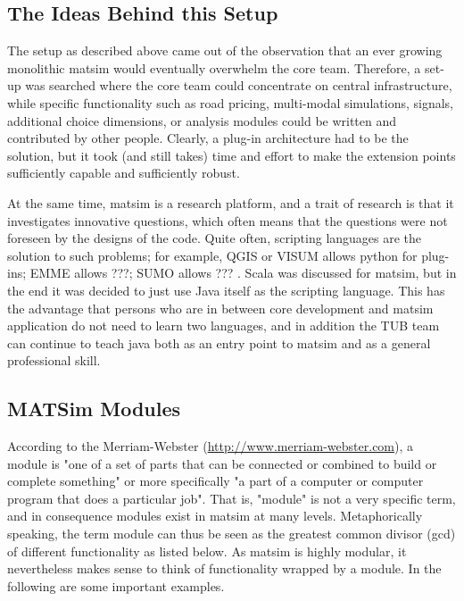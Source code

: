 
\subsection{The Ideas Behind this Setup}
The setup as described above came out of the observation that an ever growing monolithic \gls{matsim} would eventually overwhelm the core team. Therefore, a set-up was searched where the core team could concentrate on central infrastructure, while specific functionality such as road pricing, multi-modal simulations, signals, additional choice dimensions, or analysis modules could be written and contributed by other people. Clearly, a plug-in architecture had to be the solution, but it took (and still takes) time and effort to make the extension points sufficiently capable and sufficiently robust.  

At the same time, \gls{matsim} is a research platform, and a trait of research is that it investigates innovative questions, which often means that the questions were not foreseen by the designs of the code.  Quite often, scripting languages are the solution to such problems; for example, QGIS or VISUM allows python \cite{...} for plug-ins; EMME allows ???; SUMO allows ??? .  Scala \cite{...} was discussed for \gls{matsim}, but in the end it was decided to just use Java itself as the scripting language. This has the advantage that persons who are in between core development and \gls{matsim} application do not need to learn two languages, and in addition the TUB team can continue to teach \gls{java} both as an entry point to \gls{matsim} and as a general professional skill.

\subsection{MATSim Modules}
According to the Merriam-Webster (\url{http://www.merriam-webster.com}), a module is
%
"one of a set of parts that can be connected or combined to build or complete something" 
%
or more specifically
%
"a part of a computer or computer program that does a particular job". 
%
That is, "module" is not a very specific term, and in consequence modules exist in \gls{matsim} at many levels. Metaphorically speaking, the term module can thus be seen as the greatest common divisor (gcd) of different functionality as listed below.
%
As \gls{matsim} is 
highly modular, it nevertheless makes sense to think of functionality wrapped by a module. In the following are some important examples.

